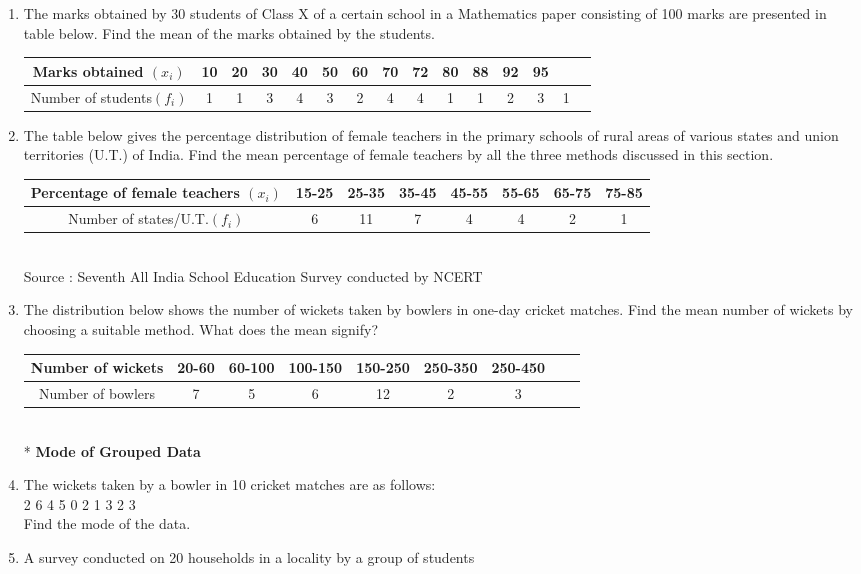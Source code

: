 \renewcommand{\theequation}{\theenumi}
\begin{enumerate}[label=\arabic*.,ref=\thesubsection.\theenumi]
\item The marks obtained by 30 students of Class X of a certain school in a Mathematics paper consisting of 100 marks are presented in table below. Find the mean of the marks obtained by the students.\\
\begin{tabular}{|c|c|c|c|c|c|c||c|c|c|c|c|c|c|c|}
\hline
Marks obtained $(x_i)$&10&20&30&40&50&60&70&72&80&88&92&95\\
\hline
Number of students$(f_i)$ &1&1&3&4&3&2&4&4&1&1&2&3&1\\
\hline
\end{tabular}
\item The table below gives the percentage distribution of female teachers in the primary schools of rural areas of various states and union territories (U.T.) of India. Find the mean percentage of female teachers by all the three methods discussed
in this section.\\
\begin{tabular}{|c|c|c|c|c|c|c|c|}
\hline
Percentage of female teachers $(x_i)$&15-25&25-35&35-45&45-55&55-65&65-75&75-85\\
\hline
Number of states/U.T.$(f_i)$&6&11&7&4&4&2&1\\
\hline
\end{tabular}\\
Source : Seventh All India School Education Survey conducted by NCERT
\item The distribution below shows the number of wickets taken by bowlers in one-day cricket matches. Find the mean number of wickets by choosing a suitable
method. What does the mean signify?
\begin{tabular}{|c|c|c|c|c|c|c|c|c|}
\hline
Number of wickets &20-60&60-100&100-150&150-250&250-350&250-450\\
\hline
Number of bowlers &7&5&6&12&2&3\\
\hline
\end{tabular}\\*
{\Large \textbf{Mode of Grouped Data}}
\item The wickets taken by a bowler in 10 cricket matches are as follows:\\
2 6 4 5 0 2 1 3 2 3\\
Find the mode of the data.\\
\item A survey conducted on 20 households in a locality by a group of students

\end{enumerate}
